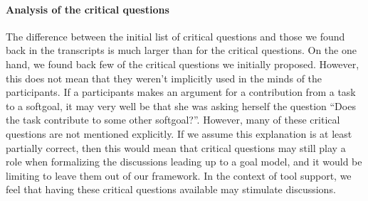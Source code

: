 \paragraph{Analysis of the critical questions} The difference between the initial list of critical questions and those we found back in the transcripts is much larger than for the critical questions. On the one hand, we found back few of the critical questions we initially proposed. However, this does not mean that they weren't implicitly used in the minds of the participants. If a participants makes an argument for a contribution from a task to a softgoal, it may very well be that she was asking herself the question ``Does the task contribute to some other softgoal?''. However, many of these critical questions are not mentioned explicitly. If we assume this explanation is at least partially correct, then this would mean that critical questions may still play a role when formalizing the discussions leading up to a goal model, and it would be limiting to leave them out of our framework. In the context of tool support, we feel that having these critical questions available may stimulate discussions.


